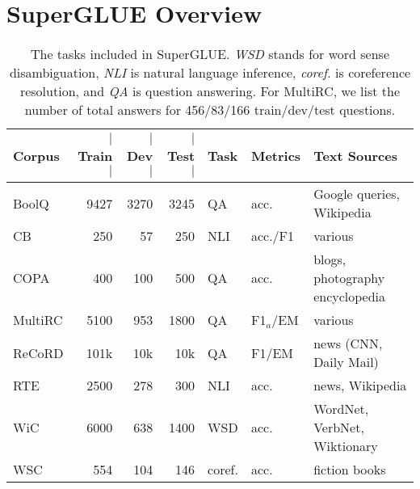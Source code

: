 \section{SuperGLUE Overview}

\begin{table*}[t]
\caption{The tasks included in SuperGLUE.  
\textit{WSD} stands for word sense disambiguation, \textit{NLI} is natural language inference, \textit{coref.} is coreference resolution, and \textit{QA} is question answering. For MultiRC, we list the number of total answers for 456/83/166 train/dev/test questions. 
}
\centering \small
\begin{tabular}{lrrrlll}
 \toprule
\textbf{Corpus} & \textbf{$|$Train$|$} & \textbf{$|$Dev$|$} & \textbf{$|$Test$|$} & \textbf{Task} & \textbf{Metrics} & \textbf{Text Sources} \\
\midrule 
BoolQ & 9427 & 3270 & 3245 & QA & acc. & Google queries, Wikipedia \\
CB & 250 & 57 & 250 & NLI & acc./F1 & various \\
COPA & 400 & 100 & 500 & QA & acc. & blogs, photography encyclopedia\\
MultiRC & 5100 & 953 & 1800 & QA & F1$_a$/EM & various \\
ReCoRD & 101k & 10k & 10k & QA & F1/EM & news (CNN, Daily Mail) \\
RTE & 2500 & 278 & 300 & NLI & acc. & news, Wikipedia \\
WiC & 6000 & 638 & 1400 & WSD & acc. & WordNet, VerbNet, Wiktionary \\
WSC & 554 & 104 & 146 & coref. & acc. & fiction books \\
\bottomrule
\end{tabular}
\label{tab:tasks}
\end{table*}

